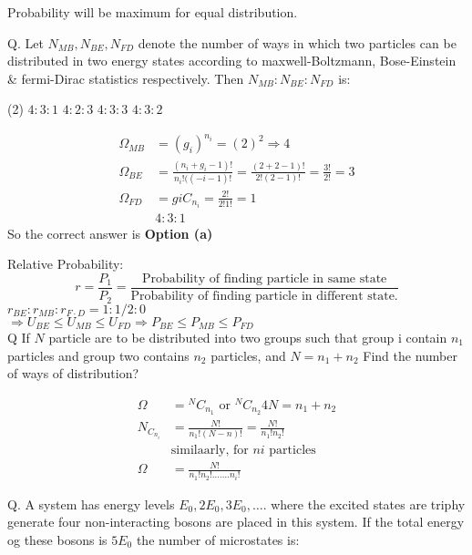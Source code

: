 \begin{note}
	Probability will be maximum for equal distribution.
\end{note}
Q. Let $N_{M B}, N_{B E}, N_{F D}$ denote the number of ways in which two particles can be distributed in two energy states according to maxwell-Boltzmann, Bose-Einstein \& fermi-Dirac statistics respectively. Then $N_{M B}: N_{B E}: N_{F D}$ is:
 \begin{tasks}(2)
	\task[\textbf{a.}]$4: 3: 1$
	\task[\textbf{b.}] $4: 2: 3$
	\task[\textbf{c.}]$4: 3: 3$
	\task[\textbf{d.}] $4: 3: 2$
\end{tasks}
\begin{answer}
	\begin{align*}
	\Omega_{M B}&=\left(g_{i}\right)^{n_{i}}=(2)^{2} \Rightarrow 4 \\
	\Omega_{B E}&=\frac{\left(n_{i}+g_{i}-1\right) !}{n_{i} !((-i-1) !}=\frac{(2+2-1) !}{2 !(2-1) !}=\frac{3 !}{2 !}=3\\
	\Omega_{F D}&=g i C_{n_{i}}=\frac{2 !}{2 ! 1 !}=1\\
	&4:3:1
	\end{align*}
	So the correct answer is \textbf{Option (a)}
\end{answer}
Relative Probability: \\
$$r=\frac{P_1}{P_2}=\frac{\text{Probability of finding particle in same state}}{\text{Probability of finding particle in different state.}}$$
$r_{B E}: r_{M B}: r_{F \cdot D}=1: 1 / 2: 0$\\
$\Rightarrow U_{B E} \leqslant U_{M B} \leqslant U_{F D} \Rightarrow P_{B E} \leqslant P_{M B} \leqslant P_{F D}$ \\
Q If $N$ particle are to be distributed into two groups such that group i contain $n_1$ particles and group two contains $n_2$ particles, and $N=n_1+n_2$ Find the number of ways of distribution?
\begin{answer}
	\begin{align*}
	\Omega&={ }^{N} C_{n_{1}} \text { or }{ }^{N} C_{n_{2}} 4 N=n_{1}+n_{2}\\
	N_{C_{n_{i}}}&=\frac{N !}{n_{1} !(N-n) !}=\frac{N !}{n_{1} ! n_{2} !}\\
	&\text{similaarly, for $ni$ particles}\\
	\Omega&=\frac{N!}{n_1!n_2!.......n_i!}
	\end{align*}
\end{answer}
Q. A system has energy levels $E_{0}, 2 E_{0}, 3 E_{0}, \ldots .$ where the excited states are triphy generate four non-interacting bosons are placed in this system. If the total energy og these bosons is $5E_0$ the number of microstates is:
